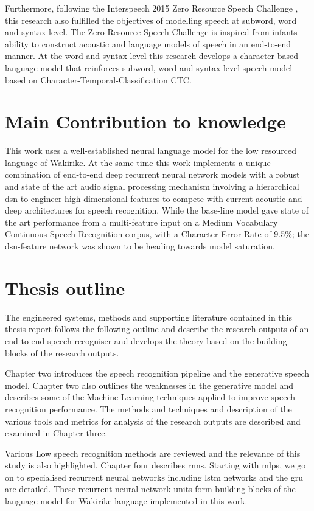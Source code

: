 Furthermore, following the Interspeech 2015 Zero Resource Speech Challenge \citep{versteegh2015zero}, this research also fulfilled the objectives of modelling speech at subword, word and syntax level. The Zero Resource Speech Challenge is inspired from infants ability to construct acoustic and language models of speech in an end-to-end manner. At the word and syntax level this research develops a character-based language model that reinforces subword, word and syntax level speech model based on Character-Temporal-Classification CTC.


\section{Main Contribution to knowledge}

This work uses a well-established neural language model for the low resourced language of Wakirike.  At the same time this work implements a unique combination of end-to-end deep recurrent neural network models with a robust and state of the art audio signal processing mechanism involving a hierarchical \acrfull{dsn} to engineer high-dimensional features to compete with current acoustic and deep architectures for speech recognition. While the base-line model gave state of the art performance from a multi-feature input on a Medium Vocabulary Continuous Speech Recognition corpus, with a Character Error Rate of 9.5\%; the \acrshort{dsn}-feature network was shown to be heading towards model saturation.

\section{Thesis outline}
The engineered systems, methods and supporting literature contained in this thesis report follows the following outline and describe the research outputs of an end-to-end speech recogniser and develops the theory based on the building blocks of the research outputs.

Chapter two introduces the speech recognition pipeline and the generative speech model.  Chapter two also outlines the weaknesses in the generative model and describes some of the Machine Learning techniques applied to improve speech recognition performance.  The methods and techniques and description of the various tools and metrics for analysis of the research outputs are described and examined in Chapter three.

Various Low speech recognition methods are reviewed and the relevance of this study is also highlighted.  Chapter four describes \acrfull{rnns}. Starting with \acrfull{mlps}, we go on to specialised recurrent neural networks including \acrfull{lstm} networks and the \acrfull{gru} are detailed. These recurrent neural network units form building blocks of the language model for Wakirike language implemented in this work.

